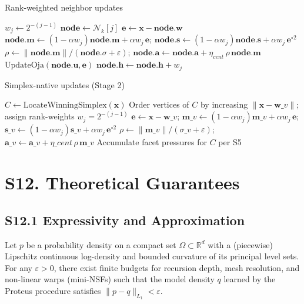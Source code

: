 \documentclass[11pt]{article}
\begin{document}
\begin{algorithm}[h]
\caption{Rank-weighted neighbor updates}
\label{alg:rankupdates}
\begin{algorithmic}[1]
        \State $w_j \gets 2^{-(j-1)}$
        \State $\mathbf{node} \gets \mathcal{N}_k[j]$
        \State $\mathbf e \gets \mathbf x - \mathbf{node}.\mathbf w$
        \State $\mathbf{node.m} \gets (1-\alpha w_j)\mathbf{node.m} + \alpha w_j\,\mathbf e$; $\mathbf{node.s} \gets (1-\alpha w_j)\mathbf{node.s} + \alpha w_j\,\mathbf e^{\circ 2}$
        \State $\rho \gets \lVert \mathbf{node.m} \rVert/(\mathbf{node.}\sigma+\varepsilon)$; $\mathbf{node.a} \gets \mathbf{node.a} + \eta_{cent}\,\rho\,\mathbf{node.m}$
        \State $\text{UpdateOja}(\mathbf{node.u}, \mathbf e)$
        \State $\mathbf{node.h} \gets \mathbf{node.h} + w_j$ 
    \EndFor
\EndProcedure
\end{algorithmic}
\end{algorithm}

\begin{algorithm}[h]
\caption{Simplex-native updates (Stage 2)}
\label{alg:stage2updates}
\begin{algorithmic}[1]
    \State $C \gets \text{LocateWinningSimplex}(\mathbf x)$ 
    \State Order vertices of $C$ by increasing $\lVert \mathbf x - \mathbf w\_v \rVert$; assign rank-weights $w_j=2^{-(j-1)}$
        \State $\mathbf e \gets \mathbf x - \mathbf w\_v$; $\mathbf m\_v \gets (1-\alpha w_j)\mathbf m\_v + \alpha w_j\,\mathbf e$; $\mathbf s\_v \gets (1-\alpha w_j)\mathbf s\_v + \alpha w_j\,\mathbf e^{\circ 2}$
        \State $\rho \gets \lVert \mathbf m\_v \rVert/(\sigma\_v+\varepsilon)$; $\mathbf a\_v \gets \mathbf a\_v + \eta\_{cent}\,\rho\,\mathbf m\_v$
    \EndFor
    \State Accumulate facet pressures for $C$ per S5
\EndProcedure
\end{algorithmic}
\end{algorithm}

\section*{S12. Theoretical Guarantees}
\subsection*{S12.1 Expressivity and Approximation}
Let $p$ be a probability density on a compact set $\Omega\subset\mathbb R^d$ with a (piecewise) Lipschitz continuous log-density and bounded curvature of its principal level sets. For any $\varepsilon{>}0$, there exist finite budgets for recursion depth, mesh resolution, and non-linear warps (mini-NSFs) such that the model density $q$ learned by the Proteus procedure satisfies $\lVert p-q\rVert_{L_1} < \varepsilon$.
\end{document}
